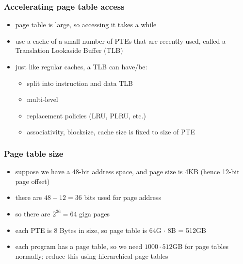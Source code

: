 \documentclass[12pt]{extarticle}
\begin{document}
	\subsubsection{Accelerating page table access}

	\begin{itemize}
		\item page table is large, so accessing it takes a while
		\item use a cache of a small number of PTEs that are recently used, called a Translation Lookaside Buffer (TLB)
		\item just like regular caches, a TLB can have/be:
		\begin{itemize}
			\item split into instruction and data TLB
			\item multi-level
			\item replacement policies (LRU, PLRU, etc.)
			\item associativity, blocksize, cache size is fixed to size of PTE
		\end{itemize}
	\end{itemize}

	\subsubsection{Page table size}

	\begin{itemize}
		\item suppose we have a 48-bit address space, and page size is 4KB (hence 12-bit page offset)
		\item there are $48 - 12 = 36$ bits used for page address
		\item so there are $2^{36} = 64$ giga pages
		\item each PTE is 8 Bytes in size, so page table is 64G $\cdot$ 8B = 512GB
		\item each program has a page table, so we need $1000 \cdot 512$GB for page tables normally; reduce this using 
		hierarchical page tables
	\end{itemize}

	
\end{document}
